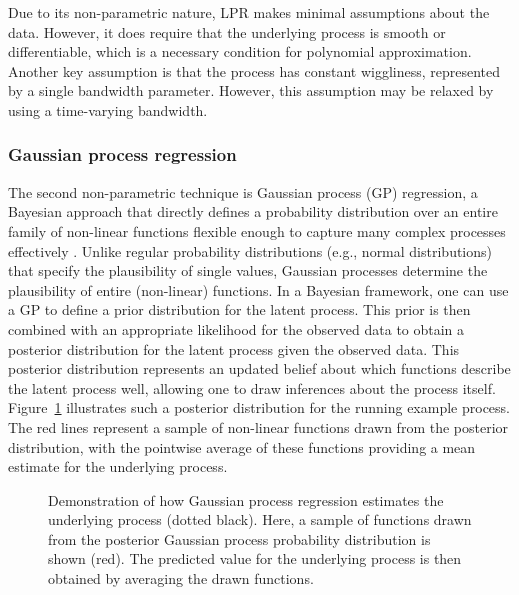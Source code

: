 \documentclass[man, floatsintext]{apa7}
\begin{document}
Due to its non-parametric nature, LPR makes minimal assumptions about the data.
However, it does require that the underlying process is smooth or
differentiable, which is
a necessary condition for polynomial approximation.
Another key assumption is that the process has constant
wiggliness, represented by a single bandwidth parameter. However,
this assumption may be relaxed by using a time-varying bandwidth.

\subsubsection{Gaussian process regression}

The second non-parametric technique is Gaussian process (GP) regression, a
Bayesian approach that directly defines a probability distribution over an
entire family of non-linear functions flexible enough to capture many complex
processes effectively \parencite{rasmussen_gaussian_2006,
  betancourt_robust_2020, roberts_gaussian_2013}. Unlike regular probability
distributions (e.g., normal distributions) that specify the plausibility of
single values, Gaussian processes determine the plausibility of entire
(non-linear) functions. In a Bayesian framework, one can use a GP to define
a prior distribution for the latent process. This prior is then combined
with an appropriate likelihood for the observed data to obtain a posterior
distribution for the latent process given the observed data.
This posterior distribution represents an updated belief about which functions
describe the latent process well, allowing one to draw inferences about the
process itself. Figure~\ref{fig:gp_dem} illustrates such a posterior
distribution for the running
example process. The red lines represent a sample of non-linear functions
drawn from the posterior distribution, with the pointwise average of these
functions providing a mean estimate for the underlying process.

\begin{figure}[!ht]
  \caption{Demonstration of how Gaussian process regression estimates the
    underlying process (dotted black). Here, a sample of functions drawn from
    the
    posterior Gaussian process probability distribution is shown (red). The
    predicted value for the underlying process is then obtained by averaging
    the
    drawn functions.}
  \label{fig:gp_dem}
\end{figure}
\end{document}

